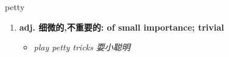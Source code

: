 
\begin{frame}
{\huge petty}
\begin{center}
\begin{enumerate}\Large
  \item \textbf{adj. 细微的,不重要的: of small importance; trivial}
  \begin{itemize}
    \item \em{\Large{play petty tricks 耍小聪明}}
  \end{itemize}
\end{enumerate}
\end{center}
\end{frame}
